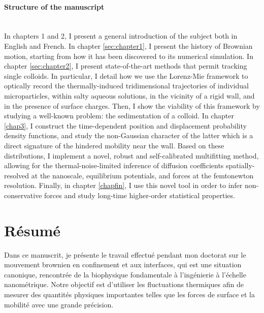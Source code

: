 \paragraph*{Structure of the manuscript}\mbox{}\\
In chapters 1 and 2, I present a general introduction of the subject both in English and French. In chapter \ref{sec:chapter1}, I present the history of Brownian motion, starting from how it has been discovered to its numerical simulation. In chapter \ref{sec:chapter2}, I present state-of-the-art methods that permit tracking single colloids. In particular, I detail how we use the Lorenz-Mie framework to optically record the thermally-induced tridimensional trajectories of individual microparticles, within salty aqueous solutions, in the vicinity of a rigid wall, and in the presence of surface charges. Then, I show the viability of this framework by studying a well-known problem: the sedimentation of a colloid. In chapter \ref{chap3}, I construct the time-dependent position and displacement probability density functions, and study the non-Gaussian character of the latter which is a direct signature of the hindered mobility near the wall. Based on these distributions, I implement a novel, robust and self-calibrated multifitting method, allowing for the thermal-noise-limited inference of diffusion coefficients spatially-resolved at the nanoscale, equilibrium potentials, and forces at the femtonewton resolution. Finally, in chapter \ref{chapfin}, I use this novel tool in order to infer non-conservative forces and study long-time higher-order statistical properties.

\newpage

\section*{Résumé}

Dans ce manuscrit, je présente le travail effectué pendant mon doctorat sur le mouvement brownien en confinement et aux interfaces, qui est une situation canonique, rencontrée de la biophysique fondamentale à l'ingénierie à l'échelle nanométrique.  Notre objectif est d'utiliser les fluctuations thermiques afin de mesurer des quantités physiques importantes telles que les forces de surface et la mobilité avec une grande précision.


